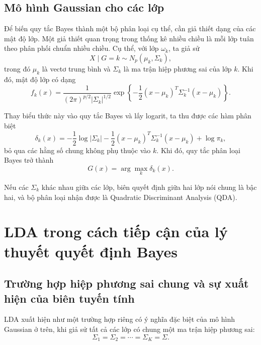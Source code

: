 \subsection{Mô hình Gaussian cho các lớp}

Để biến quy tắc Bayes thành một bộ phân loại cụ thể, cần giả thiết dạng của các mật độ lớp. Một giả thiết quan trọng trong thống kê nhiều chiều là mỗi lớp tuân theo phân phối chuẩn nhiều chiều. Cụ thể, với lớp $\omega_k$, ta giả sử
\begin{equation}
X\mid G=k \sim N_p(\mu_k,\Sigma_k),
\end{equation}
trong đó $\mu_k$ là vectơ trung bình và $\Sigma_k$ là ma trận hiệp phương sai của lớp $k$. Khi đó, mật độ lớp có dạng
\begin{equation}
f_k(x)=\frac{1}{(2\pi)^{p/2}|\Sigma_k|^{1/2}}
\exp\left\{-\frac12(x-\mu_k)^T\Sigma_k^{-1}(x-\mu_k)\right\}.
\end{equation}

Thay biểu thức này vào quy tắc Bayes và lấy logarit, ta thu được các hàm phân biệt
\begin{equation}
\delta_k(x)= -\frac12\log |\Sigma_k|
-\frac12(x-\mu_k)^T\Sigma_k^{-1}(x-\mu_k)
+\log \pi_k,
\end{equation}
bỏ qua các hằng số chung không phụ thuộc vào $k$. Khi đó, quy tắc phân loại Bayes trở thành
\begin{equation}
G(x)=\arg\max_k \delta_k(x).
\end{equation}

Nếu các $\Sigma_k$ khác nhau giữa các lớp, biên quyết định giữa hai lớp nói chung là bậc hai, và bộ phân loại nhận được là Quadratic Discriminant Analysis (QDA).

\section{LDA trong cách tiếp cận của lý thuyết quyết định Bayes}

\subsection{Trường hợp hiệp phương sai chung và sự xuất hiện của biên tuyến tính}

LDA xuất hiện như một trường hợp riêng có ý nghĩa đặc biệt của mô hình Gaussian ở trên, khi giả sử tất cả các lớp có chung một ma trận hiệp phương sai:
\begin{equation}
\Sigma_1=\Sigma_2=\cdots=\Sigma_K=\Sigma.
\end{equation}

